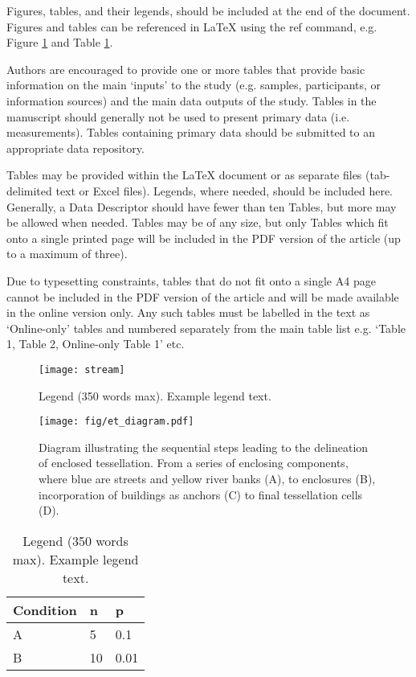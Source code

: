 \documentclass[fleqn,10pt]{wlscirep}
\begin{document}
Figures, tables, and their legends, should be included at the end of the document.
Figures and tables can be referenced in \LaTeX{} using the ref command, e.g. Figure
\ref{fig:stream} and Table \ref{tab:example}.

Authors are encouraged to provide one or more tables that provide basic information on
the main ‘inputs’ to the study (e.g. samples, participants, or information sources) and
the main data outputs of the study. Tables in the manuscript should generally not be
used to present primary data (i.e. measurements). Tables containing primary data should
be submitted to an appropriate data repository.

Tables may be provided within the \LaTeX{} document or as separate files (tab-delimited
text or Excel files). Legends, where needed, should be included here. Generally, a Data
Descriptor should have fewer than ten Tables, but more may be allowed when needed.
Tables may be of any size, but only Tables which fit onto a single printed page will be
included in the PDF version of the article (up to a maximum of three).

Due to typesetting constraints, tables that do not fit onto a single A4 page cannot be
included in the PDF version of the article and will be made available in the online
version only. Any such tables must be labelled in the text as ‘Online-only’ tables and
numbered separately from the main table list e.g. ‘Table 1, Table 2, Online-only Table
1’ etc.

\begin{figure}[ht]
\centering
\texttt{[image: stream]}
\caption{Legend (350 words max). Example legend text.}
\label{fig:stream}
\end{figure}

\begin{figure}
    \texttt{[image: fig/et\_diagram.pdf]}
    \caption{Diagram illustrating the sequential steps leading to the delineation of
    enclosed tessellation. From a series of enclosing components, where blue are streets
    and yellow river banks (A), to enclosures (B), incorporation of buildings as anchors
    (C) to final tessellation cells (D).}
    \label{fig:et_diagram}
\end{figure}

\begin{table}[ht]
\centering
\begin{tabular}{|l|l|l|}
\hline
Condition & n & p \\
\hline
A & 5 & 0.1 \\
\hline
B & 10 & 0.01 \\
\hline
\end{tabular}
\caption{\label{tab:example}Legend (350 words max). Example legend text.}
\end{table}
\end{document}
